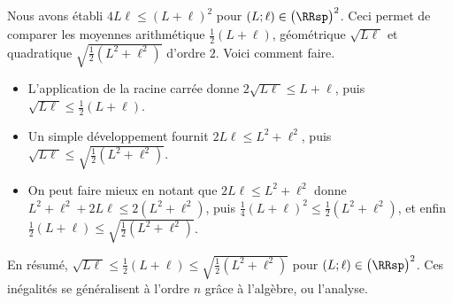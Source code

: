 \begin{remark} \label{ineq-geo-quad-arith}
	Nous avons établi
	$4 L \ell \leq (L + \ell)^2$
	pour $(L ; \ell) \in \big( \RRsp \big)^2$.
	Ceci permet de comparer les moyennes arithmétique $\frac12 (L + \ell)$, géométrique $\sqrt{L \ell}$ et quadratique $\sqrt{\frac12 (L^2 + \ell^2)}$ d'ordre $2$.
	Voici comment faire.
	\begin{itemize}
		\item L'application de la racine carrée donne
		$2 \sqrt{L \ell} \leq L + \ell$, puis 
		$\sqrt{L \ell} \leq \frac12 (L + \ell)$.
		
		\item Un simple développement fournit $2 L \ell \leq L^2 + \ell^2$, puis
    	$\sqrt{L \ell} \leq \sqrt{\frac12 (L^2 + \ell^2)}$.
		
		\item On peut faire mieux en notant que $2 L \ell \leq L^2 + \ell^2$ donne
		$L^2 + \ell^2 + 2 L \ell \leq 2 (L^2 + \ell^2)$, puis
		$\frac14 (L + \ell)^2 \leq \frac12 (L^2 + \ell^2)$, et enfin 
		$\frac12 (L + \ell) \leq \sqrt{\frac12 (L^2 + \ell^2)}$.
	\end{itemize}
	
	En résumé,
	$\sqrt{L \ell} \leq \frac12 (L + \ell) \leq \sqrt{\frac12 (L^2 + \ell^2)}$
	pour $(L ; \ell) \in \big( \RRsp \big)^2$.
	Ces inégalités se généralisent à l'ordre $n$ grâce à l'algèbre, ou l'analyse.
\end{remark}
